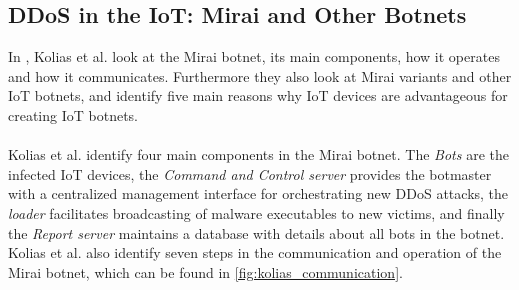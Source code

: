 \documentclass[a4paper,10pt]{article}
\begin{document}
\subsection{{DDoS} in the {IoT}: Mirai and Other Botnets} \label{sec:literature_review:kolias2017}
In \cite{Kolias2017}, Kolias et al. look at the Mirai botnet, its main components, how it operates and how it communicates.
Furthermore they also look at Mirai variants and other IoT botnets, and identify five main reasons why IoT devices are
advantageous for creating IoT botnets.
\\\\
Kolias et al. identify four main components in the Mirai botnet. The \textit{Bots} are the infected IoT devices, the 
\textit{Command and Control server} provides the botmaster with a centralized management interface for 
orchestrating new DDoS attacks, the \textit{loader} facilitates broadcasting of malware executables to new victims, and
finally the \textit{Report server} maintains a database with details about all bots in the botnet. Kolias et al. also identify 
seven steps in the communication and operation of the Mirai botnet, which can be found in \autoref{fig:kolias_communication}.
\end{document}
